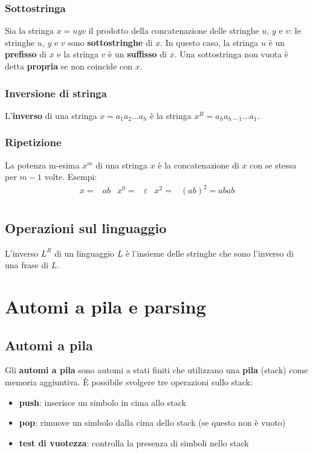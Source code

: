 \documentclass[11pt]{article}
\begin{document}
\subsubsection{Sottostringa}
Sia la stringa $x=uyv$ il prodotto della concatenazione delle stringhe $u$, $y$ e $v$: le stringhe $u$, $y$ e $v$ sono 
\textbf{sottostringhe} di $x$. In questo caso, la stringa $u$ è un \textbf{prefisso} di $x$ e la stringa $v$ è un 
\textbf{suffisso} di $x$. Una sottostringa non vuota è detta \textbf{propria} se non coincide con $x$.
\subsubsection{Inversione di stringa}
L'\textbf{inverso} di una stringa $x=a_1a_2\dots a_h$ è la stringa $x^R=a_ha_{h-1}\dots a_1$.
\subsubsection{Ripetizione}
La potenza m-esima $x^m$ di una stringa $x$ è la concatenazione di $x$ con se stessa per $m-1$ volte. Esempi:
\begin{align*}
    x=&ab    &   x^0=&\varepsilon    &   x^2=&(ab)^2=abab\\  
\end{align*}
\subsection{Operazioni sul linguaggio}
L'inverso $L^R$ di un linguaggio $L$ è l'insieme delle stringhe che sono l'inverso di una frase di $L$.

\section{Automi a pila e parsing}
\subsection{Automi a pila}
Gli \textbf{automi a pila} sono automi a stati finiti che utilizzano una \textbf{pila} (stack) come memoria aggiuntiva.
È possibile svolgere tre operazioni sullo stack:
\begin{itemize}
    \item \textbf{push}: inserisce un simbolo in cima allo stack
    \item \textbf{pop}: rimuove un simbolo dalla cima dello stack (se questo non è vuoto)
    \item \textbf{test di vuotezza}: controlla la presenza di simboli nello stack 
\end{itemize}
\end{document}

